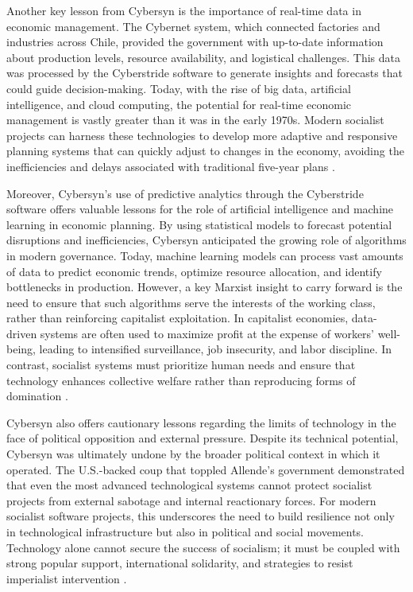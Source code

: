 \begin{refsection}
Another key lesson from Cybersyn is the importance of real-time data in economic management. The Cybernet system, which connected factories and industries across Chile, provided the government with up-to-date information about production levels, resource availability, and logistical challenges. This data was processed by the Cyberstride software to generate insights and forecasts that could guide decision-making. Today, with the rise of big data, artificial intelligence, and cloud computing, the potential for real-time economic management is vastly greater than it was in the early 1970s. Modern socialist projects can harness these technologies to develop more adaptive and responsive planning systems that can quickly adjust to changes in the economy, avoiding the inefficiencies and delays associated with traditional five-year plans \cite[pp.~149-152]{beer1994}.

Moreover, Cybersyn’s use of predictive analytics through the Cyberstride software offers valuable lessons for the role of artificial intelligence and machine learning in economic planning. By using statistical models to forecast potential disruptions and inefficiencies, Cybersyn anticipated the growing role of algorithms in modern governance. Today, machine learning models can process vast amounts of data to predict economic trends, optimize resource allocation, and identify bottlenecks in production. However, a key Marxist insight to carry forward is the need to ensure that such algorithms serve the interests of the working class, rather than reinforcing capitalist exploitation. In capitalist economies, data-driven systems are often used to maximize profit at the expense of workers' well-being, leading to intensified surveillance, job insecurity, and labor discipline. In contrast, socialist systems must prioritize human needs and ensure that technology enhances collective welfare rather than reproducing forms of domination \cite[pp.~701-705]{marx2008}.

Cybersyn also offers cautionary lessons regarding the limits of technology in the face of political opposition and external pressure. Despite its technical potential, Cybersyn was ultimately undone by the broader political context in which it operated. The U.S.-backed coup that toppled Allende’s government demonstrated that even the most advanced technological systems cannot protect socialist projects from external sabotage and internal reactionary forces. For modern socialist software projects, this underscores the need to build resilience not only in technological infrastructure but also in political and social movements. Technology alone cannot secure the success of socialism; it must be coupled with strong popular support, international solidarity, and strategies to resist imperialist intervention \cite[pp.~241-245]{kornbluh2016}.


\end{refsection}
